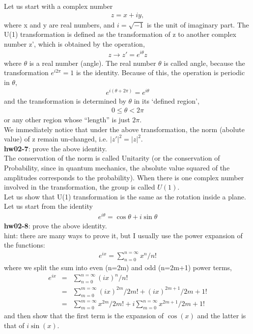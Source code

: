 \documentclass[12pt]{article}
\begin{document}
Let us start with a complex number
\begin{eqnarray} 
z = x + iy,
\end{eqnarray} 
where x and y are real numbers, and $i=\sqrt{-1}$ is the
unit of imaginary part.  The U(1) transformation is
defined as the transformation of z to another complex
number z', which is obtained by the operation,
\begin{eqnarray} 
z \to z' = e^{i\theta} z
\end{eqnarray} 
where $\theta$ is a real number (angle).  The real number
$\theta$ is called angle, because the transformation
$e^{i2\pi} = 1$
is the identity.  Because of this, the operation is periodic
in $\theta$,
\begin{eqnarray} 
e^{i(\theta + 2\pi)} = e^{i\theta}
\end{eqnarray} 
and the transformation is determined by $\theta$ in its
`defined region',
\begin{eqnarray} 
0 \leq \theta < 2\pi
\end{eqnarray} 
or any other region whose ``length'' is just $2\pi$.\\
We immediately notice that under the above transformation,
the norm (abolute value) of z remain un-changed, i.e. $|z'|^2 = |z|^2$.\\

{\bf hw02-7}: prove the above identity.\\

The conservation of the norm is called Unitarity (or the
conservation of Probability, since in quantum mechanics,
the absolute value squared of the amplitudes corresponds
to the probability).  When there is one complex number
involved in the transformation, the group is called $U(1)$.\\

Let us show that U(1) transformation is the same as the
rotation inside a plane.  Let us start from the identity
\begin{eqnarray} 
e^{i\theta} = \cos\theta + i\sin\theta
\end{eqnarray} 
{\bf hw02-8}: prove the above identity.\\

hint: there are many ways to prove it, but I usually use the
power expansion of the functions:
\begin{eqnarray} 
e^{ix} = \sum_{n=0}^{n=\infty} x^n/n!
\end{eqnarray} 
where we split the sum into even (n=2m) and odd (n=2m+1)
power terms,
\begin{eqnarray} 
e^{ix}&=&\sum_{n=0}^{n=\infty} (ix)^n/n!\\
&=&\sum_{m=0}^{m=\infty}  (ix)^{2m}/{2m}! + (ix)^{2m+1}/{2m+1}!\\
&=&\sum_{m=0}^{m=\infty} x^{2m}/{2m}!+i \sum_{m=0}^{n=\infty} x^{2m+1}/{2m+1}!
\end{eqnarray}
and then show that the first term is the expansion of $\cos(x)$
and the latter is that of $i\sin(x)$.\\
\end{document}
